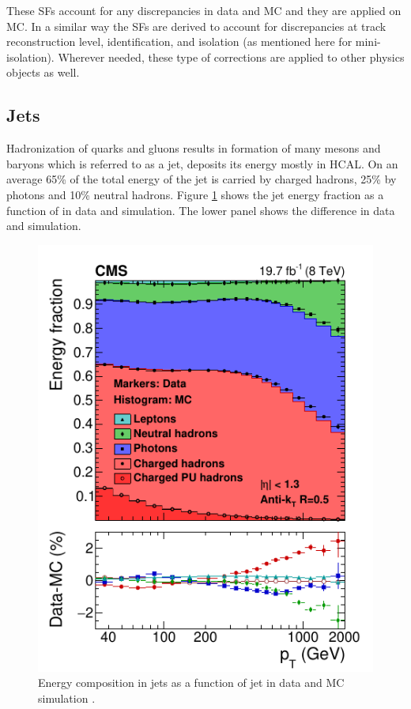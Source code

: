 These SFs account for any discrepancies in data and MC and they are applied on MC. In a similar way the SFs are derived to account for 
discrepancies at track reconstruction level, identification, and isolation (as mentioned here for mini-isolation). Wherever needed, these 
type of corrections are applied to other physics objects as well. 

 

\subsection{Jets}
Hadronization of quarks and gluons results in formation of many mesons and baryons which is referred to as a jet, deposits its energy 
mostly in HCAL. On an average 65\% of the total energy of the jet is carried by charged hadrons, 25\% by photons and 10\% neutral hadrons. 
Figure \ref{fig:JetEfrac} shows the jet energy fraction as a function of \pt in data and simulation. The lower panel shows the difference 
in data and simulation.
\begin{figure}[h!]
\centering
\includegraphics[width=0.5\linewidth]{../Figures/Chap2/JetEfrac}
\caption[Energy energy composition]{Energy composition in jets as a function of jet \pt in data and MC simulation \cite{CMS-PRF-14-001}.}
\label{fig:JetEfrac}
\end{figure}

